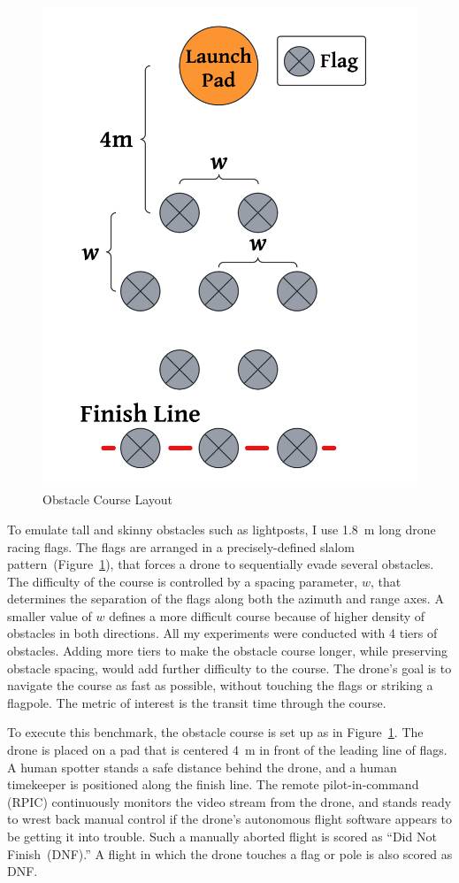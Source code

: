 \begin{figure}
    \centering
    \includegraphics[trim=-4cm 0 0 0, width=0.5\linewidth]{chapter6/FIGS/fig-obstacle-course.png}
    \caption{Obstacle Course Layout}
    \label{fig:obstacle-course}
\end{figure}

To emulate tall and skinny obstacles such as lightposts, I use 1.8~m
long drone racing flags.  The flags are
arranged in a precisely-defined slalom
pattern~(Figure~\ref{fig:obstacle-course}), that forces a drone to
sequentially evade several obstacles.  The difficulty of the course is
controlled by a spacing parameter, $w$, that determines the separation
of the flags along both the azimuth and range axes.  A smaller value
of $w$ defines a more difficult course because of higher density of
obstacles in both directions.  All my experiments were conducted with
4 tiers of obstacles.  Adding more tiers to make the obstacle course
longer, while preserving obstacle spacing, would add further
difficulty to the course.  The drone's goal is to navigate the course
as fast as possible, without touching the flags or striking a
flagpole.  The metric of interest is the transit time through the
course.

To execute this benchmark, the obstacle course is set up as in
Figure~\ref{fig:obstacle-course}.  The drone is placed on a pad that
is centered 4~m in front of the leading line of flags.  A human
spotter stands a safe distance behind the drone, and a human
timekeeper is positioned along the finish line.  The remote
pilot-in-command (RPIC) continuously monitors the video stream from
the drone, and stands ready to wrest back manual control if the
drone's autonomous flight software appears to be getting it into
trouble.  Such a manually aborted flight is scored as ``Did Not
Finish~(DNF).''  A flight in which the drone touches a flag
or pole is also scored as DNF.

